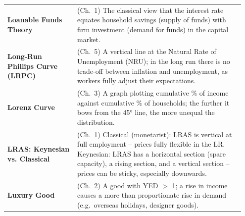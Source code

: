\documentclass[11pt, a4paper, twoside]{book}
\begin{document}
\begin{longtable}{@{}>{\RaggedRight\arraybackslash}p{0.28\linewidth}>{\RaggedRight\arraybackslash}p{0.67\linewidth}@{}}
\textbf{Loanable Funds Theory} & (Ch.~1) The classical view that the interest rate equates household savings (supply of funds) with firm investment (demand for funds) in the capital market. \\
\textbf{Long-Run Phillips Curve (LRPC)} & (Ch.~5) A vertical line at the Natural Rate of Unemployment (NRU); in the long run there is no trade-off between inflation and unemployment, as workers fully adjust their expectations. \\
\textbf{Lorenz Curve} & (Ch.~3) A graph plotting cumulative \% of income against cumulative \% of households; the further it bows from the 45° line, the more unequal the distribution. \\
\textbf{LRAS: Keynesian vs. Classical} & (Ch.~1) Classical (monetarist): LRAS is vertical at full employment -- prices fully flexible in the LR. Keynesian: LRAS has a horizontal section (spare capacity), a rising section, and a vertical section -- prices can be sticky, especially downwards. \\
\textbf{Luxury Good} & (Ch.~2) A good with YED $>$ 1; a rise in income causes a more than proportionate rise in demand (e.g.\ overseas holidays, designer goods). \\


\end{longtable}
\end{document}
